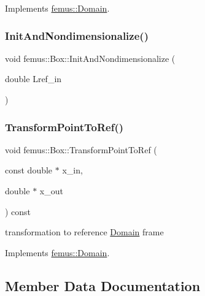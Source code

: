 Implements \mbox{\hyperlink{classfemus_1_1_domain_ad75eacc25142ba41cbceab06de675fc8}{femus\+::\+Domain}}.

\mbox{\label{classfemus_1_1_box_a68040d6347479ba7a0eb15856c2b96fa}} 
\subsubsection{\texorpdfstring{Init\+And\+Nondimensionalize()}{InitAndNondimensionalize()}}
{\footnotesize\ttfamily void femus\+::\+Box\+::\+Init\+And\+Nondimensionalize (\begin{DoxyParamCaption}\item[{double}]{Lref\+\_\+in }\end{DoxyParamCaption})}

\mbox{\label{classfemus_1_1_box_a64a23d5bb0cac88b4e545b121988b3cf}} 
\subsubsection{\texorpdfstring{Transform\+Point\+To\+Ref()}{TransformPointToRef()}}
{\footnotesize\ttfamily void femus\+::\+Box\+::\+Transform\+Point\+To\+Ref (\begin{DoxyParamCaption}\item[{const double $\ast$}]{x\+\_\+in,  }\item[{double $\ast$}]{x\+\_\+out }\end{DoxyParamCaption}) const\hspace{0.3cm}{\ttfamily [virtual]}}



transformation to reference \mbox{\hyperlink{classfemus_1_1_domain}{Domain}} frame 



Implements \mbox{\hyperlink{classfemus_1_1_domain_afde27aa114c601801cc727ef9edf31de}{femus\+::\+Domain}}.



\subsection{Member Data Documentation}
\mbox{\label{classfemus_1_1_box_a443727a5ad255d5352e92c33fac03958}} 
